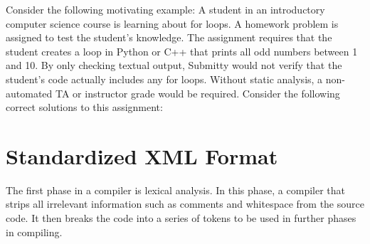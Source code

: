 \documentclass[thesis]{hmcposter}
\begin{document}
\begin{poster}
Consider the following motivating example: A student in an introductory computer science course is learning about for loops. A homework problem is assigned to test the student's knowledge. The assignment requires that the student creates a loop in Python or C++ that prints all odd numbers between 1 and 10. By only checking textual output, Submitty would not verify that the student's code actually includes any for loops. Without static analysis, a non-automated TA or instructor grade would be required. Consider the following correct solutions to this assignment:

\begin{figure}
\begin{center}
\hspace{0.4in}
\end{center}
\end{figure}

\section{Standardized XML Format}

The first phase in a compiler is lexical analysis. In this phase, a compiler that strips all irrelevant information such as comments and whitespace from the source code. It then breaks the code into a series of tokens to be used in further phases in compiling.
\vspace{0.5in}


\end{poster}
\end{document}
